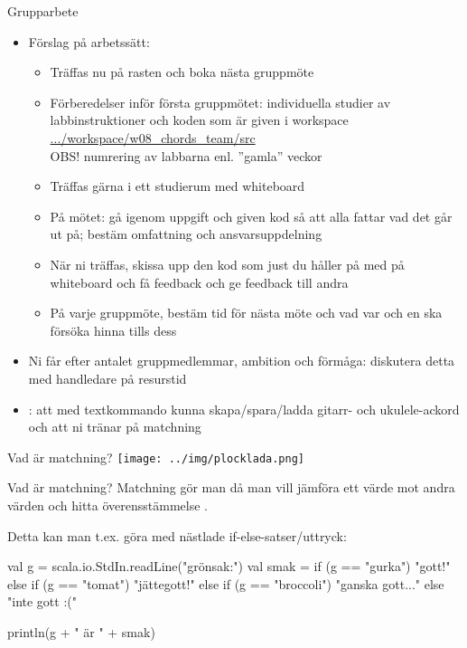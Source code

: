 \begin{Slide}{Grupparbete}\SlideFontSmall
\begin{itemize}
\item Förslag på arbetssätt:
\begin{itemize}\SlideFontSmall
\item Träffas nu på rasten och boka nästa gruppmöte
\item Förberedelser inför första gruppmötet: individuella studier av labbinstruktioner och koden som är given i workspace \\
\href{https://github.com/lunduniversity/introprog/tree/master/workspace/w08_chords_team/src}{.../workspace/w08\_chords\_team/src} \\
OBS! numrering av labbarna enl. ''gamla'' veckor
\item Träffas gärna i ett studierum med whiteboard
\item På mötet: gå igenom uppgift och given kod så att alla fattar vad det går ut på; bestäm omfattning och ansvarsuppdelning
\item När ni träffas, skissa upp den kod som just du håller på med på whiteboard och få feedback och ge feedback till andra
\item På varje gruppmöte, bestäm tid för nästa möte och vad var och en ska försöka hinna tills dess
\end{itemize}


\item Ni får  efter antalet gruppmedlemmar, ambition och förmåga: diskutera detta med handledare på resurstid

\item {}: att med textkommando kunna skapa/spara/ladda gitarr- och ukulele-ackord och att ni tränar på matchning

\end{itemize}
\end{Slide}



\begin{Slide}{Vad är matchning?}
\texttt{[image: ../img/plocklada.png]}
\end{Slide}


\begin{Slide}{Vad är matchning?}
Matchning gör man då man vill jämföra ett värde mot andra värden och hitta överensstämmelse .

\pause

\vspace{1em}Detta kan man t.ex. göra med nästlade if-else-satser/uttryck:

\begin{Code}
val g = scala.io.StdIn.readLine("grönsak:")
val smak = 
  if (g == "gurka") "gott!"
  else if (g == "tomat") "jättegott!"
  else if (g == "broccoli") "ganska gott..."
  else "inte gott :("

println(g + " är " + smak)
\end{Code}
\end{Slide}
\fi

